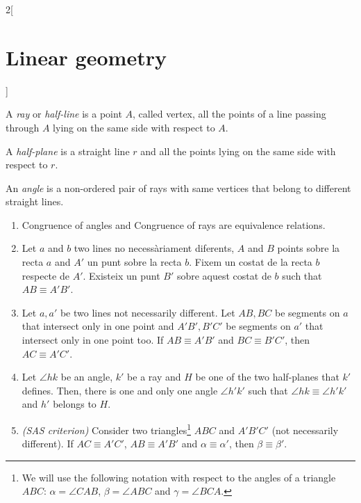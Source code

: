 \documentclass[class=article,10pt,crop=false]{standalone}
\begin{document}
\begin{multicols}{2}[\section{Linear geometry}]
\begin{axiom}
\begin{enumerate}
\end{enumerate}
\end{axiom}
\begin{definition}
A \textit{ray} or \textit{half-line} is a point $A$, called vertex, all the points of a line passing through $A$ lying on the same side with respect to $A$.
\end{definition}
\begin{definition}
A \textit{half-plane} is a straight line $r$ and all the points lying on the same side with respect to $r$.
\end{definition}
\begin{definition}
An \textit{angle} is a non-ordered pair of rays with same vertices that belong to different straight lines.
\end{definition}
\begin{axiom}
\label{3}
\hfill
\begin{enumerate}
    \item Congruence of angles and Congruence of rays are equivalence relations.
    \item Let $a$ and $b$ two lines no necessàriament diferents, $A$ and $B$ points sobre la recta $a$ and $A'$ un punt sobre la recta $b$. Fixem un costat de la recta $b$ respecte de $A'$. Existeix un punt $B'$ sobre aquest costat de $b$ such that $AB\equiv A'B'$.
    \item Let $a,a'$ be two lines not necessarily different. Let $AB,BC$ be segments on $a$ that intersect only in one point and $A'B',B'C'$ be segments on $a'$ that intersect only in one point too. If $AB\equiv A'B'$ and $BC\equiv B'C'$, then $AC\equiv A'C'$.
    \item Let $\angle hk$ be an angle, $k'$ be a ray and $H$ be one of the two half-planes that $k'$ defines. Then, there is one and only one angle $\angle h'k'$ such that $\angle hk\equiv\angle h'k'$ and $h'$ belongs to $H$.
    \item \textit{(SAS criterion)} Consider two triangles\footnote{We will use the following notation with respect to the angles of a triangle $ABC$: $\alpha=\angle CAB$, $\beta=\angle ABC$ and $\gamma=\angle BCA$.} $ABC$ and $A'B'C'$ (not necessarily different). If $AC\equiv A'C'$, $AB\equiv A'B'$ and $\alpha\equiv\alpha'$, then $\beta\equiv\beta'$.
\end{enumerate}
\end{axiom}
\begin{axiom}
\label{4}
\hfill
\begin{enumerate}

\end{enumerate}
\end{axiom}
\end{multicols}
\end{document}
